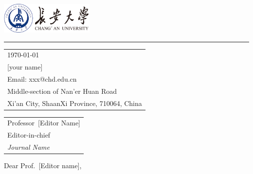 \documentclass{article}
\begin{document}

\includegraphics[width=0.35\textwidth]{chd.png} %

\vspace{-1em} %

\rule{\linewidth}{1pt} %

\bigskip\bigskip %


\hfill
\begin{tabular}{l @{}}
\hfill \today \bigskip\\ %
\hfill [your name] \\
\hfill Email: xxx@chd.edu.cn \\
\hfill Middle-section of Nan’er Huan Road\\
\hfill Xi’an City, ShaanXi Province, 710064, China \\ %
\end{tabular}

\bigskip %


\begin{tabular}{@{} l}
	Professor\ [Editor Name] \\
	Editor-in-chief \\
	\textit{Journal Name}
\end{tabular}

\bigskip %

Dear Prof.\ [Editor name],

\bigskip %

\end{document}
